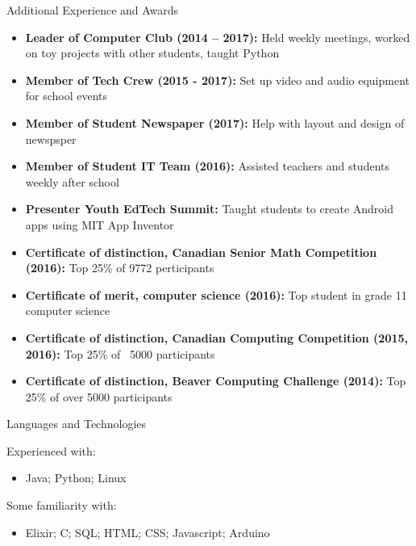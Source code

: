 \documentclass[]{mcdowellcv}
\begin{document}
	\begin{cvsection}{Additional Experience and Awards}
		\begin{cvsubsection}{}{}{}
			\begin{itemize}
				\item \textbf{Leader of Computer Club (2014 – 2017):} Held weekly meetings, worked on toy projects with other students, taught Python
				\item \textbf{Member of Tech Crew (2015 - 2017):} Set up video and audio equipment for school events
				\item \textbf{Member of Student Newspaper (2017):} Help with layout and design of newspsper
				\item \textbf{Member of Student IT Team (2016):} Assisted teachers and students weekly after school
				\item \textbf{Presenter Youth EdTech Summit:} Taught students to create Android apps using MIT App Inventor
				\item \textbf{Certificate of distinction, Canadian Senior Math Competition (2016):} Top 25\% of 9772 perticipants
				\item \textbf{Certificate of merit, computer science (2016):} Top student in grade 11 computer science
				\item \textbf{Certificate of distinction, Canadian Computing Competition (2015, 2016):} Top 25\% of ~5000 participants
				\item \textbf{Certificate of distinction, Beaver Computing Challenge (2014):} Top 25\% of over 5000 participants
			\end{itemize}
		\end{cvsubsection}
	\end{cvsection}

	\begin{cvsection}{Languages and Technologies}
		\begin{cvsubsection}{}{}{}
            Experienced with:
			\begin{itemize}
				\item Java; Python; Linux
            \end{itemize}
            Some familiarity with:
            \begin{itemize}
                \item Elixir; C; SQL; HTML; CSS; Javascript; Arduino
			\end{itemize}
		\end{cvsubsection}
	\end{cvsection}
\end{document}
